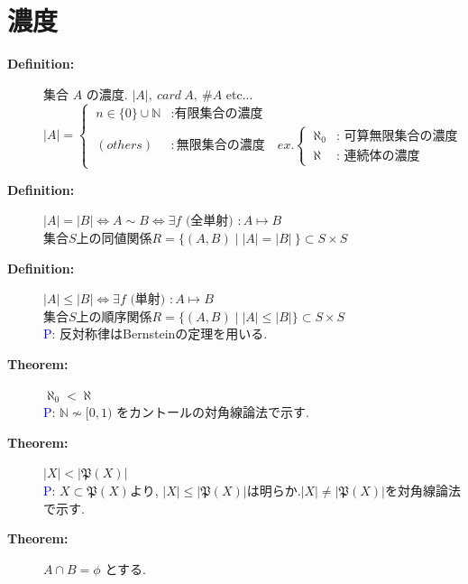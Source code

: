 \documentclass[english,dvipdfmx]{jsarticle}
\newcommand*{\proof}{\textcircled{\textcolor{blue}{\scriptsize P}}}
\begin{document}
\begin{description}
            
    
    \end{description}

\newpage
\section{濃度}
    \begin{description}
        \item[\bf{Definition:}] 集合 $A$ の濃度. $|A|,\ card \ A ,\ \# A $ etc...
            \begin{equation*}
                |A| = 
                \begin{cases}
                    \ n \in \{ 0 \} \cup \mathbb{N} &: \text{有限集合の濃度} \\
                    \ (others) &: \text{無限集合の濃度} \quad ex.
                    \begin{cases}
                        \ \aleph_0 &: \text{ 可算無限集合の濃度 } \\
                        \ \aleph &: \text{ 連続体の濃度 }
                    \end{cases}
                \end{cases}
            \end{equation*}
        \item[\bf{Definition:}] $|A| = |B| \Leftrightarrow A \sim B \Leftrightarrow \exists f \text{ (全単射) } : A \longmapsto B $ \\
            集合$S$上の同値関係$ R = \{ (A,B) \mid |A| = |B| \ \} \subset S \times S$
        \item[\bf{Definition:}] $|A| \leq |B|  \Leftrightarrow \exists f \text{ (単射) } : A \longmapsto B $ \\
            集合$S$上の順序関係$ R = \{ (A,B) \mid |A| \leq |B|  \} \subset S \times S$ \\
            \proof : 反対称律はBernsteinの定理を用いる.
        \item[\bf{Theorem:}] $ \aleph_0 < \aleph $ \\
            \proof : $ \mathbb{N} \not\sim  [ 0, 1 )$ をカントールの対角線論法で示す.
        \item[\bf{Theorem:}] $ |X| < |\mathfrak{P}(X)| $ \\
            \proof : $X \subset \mathfrak{P}(X)$より, $|X| \leq |\mathfrak{P}(X)|$は明らか.$|X| \not= |\mathfrak{P}(X)|$を対角線論法で示す.
        \item[\bf{Theorem:}] $A \cap B = \phi$ とする.
            \begin{enumerate}

\end{enumerate}
\end{description}
\end{document}
